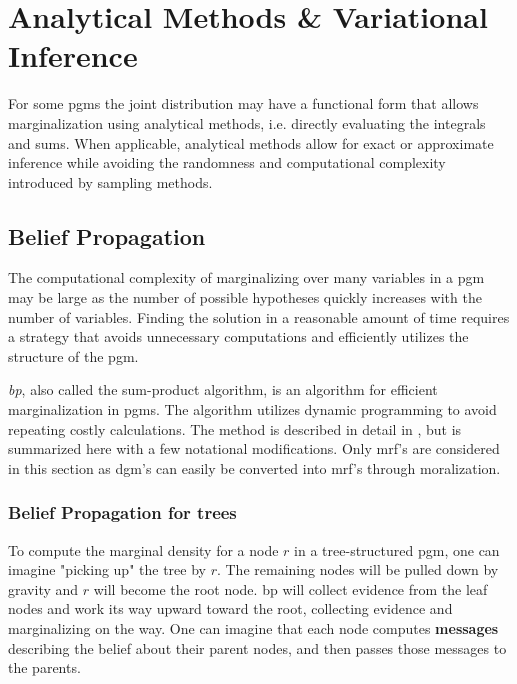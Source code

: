 \chapter{Analytical Methods \& Variational Inference}\label{chap:analytical}
For some \acrshort{pgm}s the joint distribution may have a functional form that allows marginalization using analytical methods, i.e. directly evaluating the integrals and sums. When applicable, analytical methods allow for exact or approximate inference while avoiding the randomness and computational complexity introduced by sampling methods. 


\section{Belief Propagation}
The computational complexity of marginalizing over many variables in a \acrshort{pgm} may be large as the number of possible hypotheses quickly increases with the number of variables. Finding the solution in a reasonable amount of time requires a strategy that avoids unnecessary computations and efficiently utilizes the structure of the \acrshort{pgm}. 

\textit{\acrfull{bp}}, also called the sum-product algorithm, is an algorithm for efficient marginalization in \acrshort{pgm}s. The algorithm utilizes dynamic programming to avoid repeating costly calculations. The method is described in detail in \cite[p .~710]{murphy}, but is summarized here with a few notational modifications. Only \acrshort{mrf}'s are considered in this section as \acrshort{dgm}'s can easily be converted into \acrshort{mrf}'s through \gls{moralization}.


\subsection{Belief Propagation for trees}
To compute the marginal density for a node $r$ in a tree-structured \acrshort{pgm}, one can imagine "picking up" the tree by $r$. The remaining nodes will be pulled down by gravity and $r$ will become the root node. \acrshort{bp} will collect evidence from the leaf nodes and work its way upward toward the root, collecting evidence and marginalizing on the way. One can imagine that each node computes \textbf{messages} describing the belief about their parent nodes, and then passes those messages to the parents.
